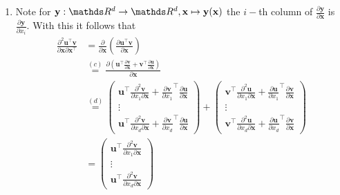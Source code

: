 \documentclass[a4paper]{article}
\begin{document}
{\begin{enumerate}
	\item Note for $\mathbf{y}:\R^d\rightarrow\R^d, \mathbf{x}\mapsto\mathbf{y}(\mathbf{x})$ the $i-$th column of $\frac{\partial\mathbf{y}}{\partial\mathbf{x}}$ is $\frac{\partial\mathbf{y}}{\partial x_i}$.
	  With this it follows that \\
	  \begin{align*}
      \frac{\partial^2 \mathbf{u}^\top \mathbf{v}}{\partial \mathbf{x}\partial\mathbf{x}^\top} &= \frac{\partial}{\partial\mathbf{x}} \left( \frac{\partial \mathbf{u}^\top \mathbf{v}}{\partial\mathbf{x}} \right) \\
      &\overset{(c)}{=} \frac{\partial ( \mathbf{u}^\top \frac{\partial  \mathbf{v}}{\partial \mathbf{x}} + \mathbf{v}^\top \frac{\partial  \mathbf{u}}{\partial \mathbf{x}} )}{\partial\mathbf{x}} \\
      &\overset{(d)}{=} \begin{pmatrix}
                          \mathbf{u}^\top \frac{\partial^2  \mathbf{v}}{\partial x_1\partial \mathbf{x}} + \frac{\partial\mathbf{v}}{\partial x_1}^\top \frac{\partial  \mathbf{u}}{\partial \mathbf{x}} \\
                          \vdots \\
                          \mathbf{u}^\top \frac{\partial^2  \mathbf{v}}{\partial x_d\partial \mathbf{x}} + \frac{\partial\mathbf{v}}{\partial x_d}^\top \frac{\partial  \mathbf{u}}{\partial \mathbf{x}}
                         \end{pmatrix}
                         +
                         \begin{pmatrix}
                           \mathbf{v}^\top \frac{\partial^2  \mathbf{u}}{\partial x_1\partial \mathbf{x}} + \frac{\partial\mathbf{u}}{\partial x_1}^\top \frac{\partial  \mathbf{v}}{\partial \mathbf{x}} \\
                           \vdots \\
                           \mathbf{v}^\top \frac{\partial^2  \mathbf{u}}{\partial x_d\partial \mathbf{x}} + \frac{\partial\mathbf{u}}{\partial x_d}^\top \frac{\partial  \mathbf{v}}{\partial \mathbf{x}}
                         \end{pmatrix} \\
      &= \begin{pmatrix}
            \mathbf{u}^\top \frac{\partial^2  \mathbf{v}}{\partial x_1\partial \mathbf{x}} \\
            \vdots \\
            \mathbf{u}^\top \frac{\partial^2  \mathbf{v}}{\partial x_d\partial \mathbf{x}}

\end{pmatrix}
\end{align*}
\end{enumerate}}
\end{document}
